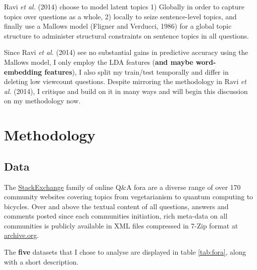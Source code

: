 \documentclass[11pt,preprint, authoryear]{article}
\numberwithin{equation}{section}
\begin{document}
Ravi \emph{et al.} (2014) choose to model latent topics 1) Globally in
order to capture topics over questions as a whole, 2) locally to seize
sentence-level topics, and finally use a Mallows model (Fligner and
Verducci, 1986) for a global topic structure to administer structural
constraints on sentence topics in all questions.

Since Ravi \emph{et al.} (2014) see no substantial gains in predictive
accuracy using the Mallows model, I only employ the LDA features
(\textbf{and maybe word-embedding features}), I also split my train/test
temporally and differ in deleting low viewcount questions. Despite
mirroring the methodology in Ravi \emph{et al.} (2014), I critique and
build on it in many ways and will begin this discussion on my
methodology now.

\newpage

\section{\texorpdfstring{Methodology
\label{Method}}{Methodology }}\label{methodology}

\subsection{\texorpdfstring{Data \label{Data}}{Data }}\label{data}

The \href{https://stackexchange.com/sites\#traffic}{StackExchange}
family of online Q\&A fora are a diverse range of over 170 community
websites covering topics from vegetarianism to quantum computing to
bicycles. Over and above the textual content of all questions, answers
and comments posted since each communities initiation, rich meta-data on
all communities is publicly available in XML files compressed in 7-Zip
format at \href{http://archive.org/download/stackexchange}{archive.org}.

The \textbf{five} datasets that I chose to analyse are displayed in
table \ref{tab:fora}, along with a short description.

\footnotesize
\end{document}
